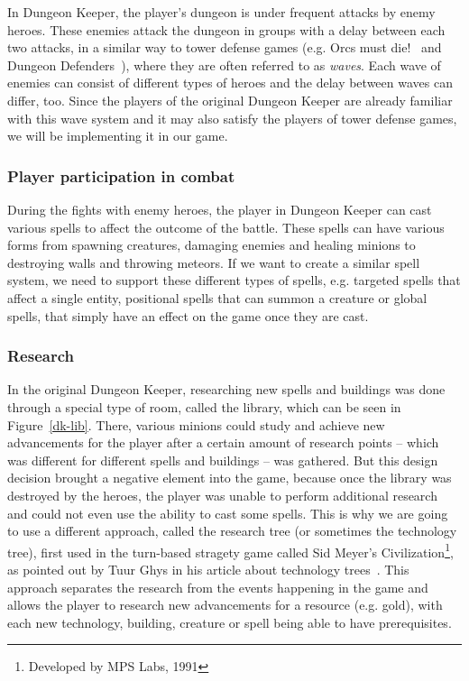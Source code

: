 In Dungeon Keeper, the player's dungeon is under frequent attacks by enemy heroes. These enemies attack the dungeon 
in groups with a delay between each two attacks, in a similar way to tower defense games (e.g. Orcs must die!~\cite{OMD} 
and Dungeon Defenders~\cite{DungeonDefenders}), where they are often referred to as \emph{waves}. Each wave of enemies
can consist of different types of heroes and the delay between waves can differ, too. Since the players of the original
Dungeon Keeper are already familiar with this wave system and it may also satisfy the players of tower defense games, we will be
implementing it in our game.

\subsubsection{Player participation in combat}

During the fights with enemy heroes, the player in Dungeon Keeper can cast various spells to affect the outcome of the battle.
These spells can have various forms from spawning creatures, damaging enemies and healing minions to destroying walls and throwing
meteors. If we want to create a similar spell system, we need to support these different types of spells, e.g. targeted spells that
affect a single entity, positional spells that can summon a creature or global spells, that simply have an effect on the game once
they are cast.

\subsubsection{Research}

In the original Dungeon Keeper, researching new spells and buildings was done through a special type of room, called the library,
which can be seen in Figure~\ref{dk-lib}. There,
various minions could study and achieve new advancements for the player after a certain amount of research points -- which was different
for different spells and buildings -- was gathered. But this design decision brought a negative element into the game, because once the
library was destroyed by the heroes, the player was unable to perform additional research and could not even use the ability to cast
some spells. This is why we are going to use a different approach, called the research tree (or sometimes the technology tree), first used
in the turn-based stragety game called Sid Meyer's Civilization\footnote{Developed by MPS Labs, 1991}, as pointed out by Tuur Ghys in his
article about technology trees~\cite{ResearchTrees}. This approach 
separates the research from the events happening in the game and allows the player to research new advancements for a resource (e.g. gold),
with each new technology, building, creature or spell being able to have prerequisites.

